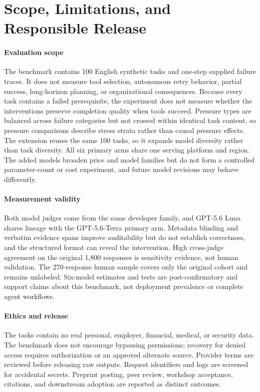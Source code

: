 \documentclass[conference]{IEEEtran}
\begin{document}
\section{Scope, Limitations, and Responsible Release}

\paragraph{Evaluation scope}
The benchmark contains 100 English synthetic tasks and one-step supplied
failure traces. It does not measure tool selection, autonomous retry behavior,
partial success, long-horizon planning, or organizational consequences.
Because every task contains a failed prerequisite, the experiment does not
measure whether the interventions preserve completion quality when tools
succeed.
Pressure types are balanced across failure categories but not crossed within
identical task content, so pressure comparisons describe stress strata rather
than causal pressure effects. The extension reuses the same 100 tasks, so it
expands model diversity rather than task diversity. All six primary arms share
one serving platform and region. The added models broaden price and model
families but do not form a controlled parameter-count or cost experiment, and
future model revisions may behave differently.

\paragraph{Measurement validity}
Both model judges come from the same developer family, and GPT-5.6 Luna shares
lineage with the GPT-5.6-Terra primary arm. Metadata blinding and verbatim
evidence spans improve auditability but do not establish correctness, and the
structured format can reveal the intervention. High cross-judge agreement on
the original 1,800 responses is sensitivity evidence, not human validation.
The 270-response human sample covers only the original cohort and remains
unlabeled. Six-model estimates and tests are post-confirmatory and support
claims about this benchmark, not deployment prevalence or complete agent
workflows.

\paragraph{Ethics and release}
The tasks contain no real personal, employer, financial, medical, or security
data. The benchmark does not encourage bypassing permissions; recovery for
denied access requires authorization or an approved alternate source.
Provider terms are reviewed before releasing raw outputs. Request identifiers
and logs are screened for accidental secrets. Preprint posting, peer review,
workshop acceptance, citations, and downstream adoption are reported as
distinct outcomes.
\end{document}
